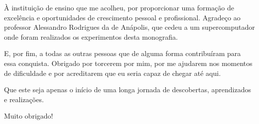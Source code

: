 À instituição de ensino que me acolheu, por proporcionar uma formação de excelência e oportunidades de crescimento pessoal e profissional.
Agradeço ao professor Alessandro Rodrigues da  de Anápolis, que cedeu a um supercomputador onde foram realizados os experimentos desta monografia.

E, por fim, a todas as outras pessoas que de alguma forma contribuíram para essa conquista. Obrigado por torcerem por mim, por me ajudarem nos momentos de dificuldade e por acreditarem que eu seria capaz de chegar até aqui.

Que este seja apenas o início de uma longa jornada de descobertas, aprendizados e realizações.

Muito obrigado!





